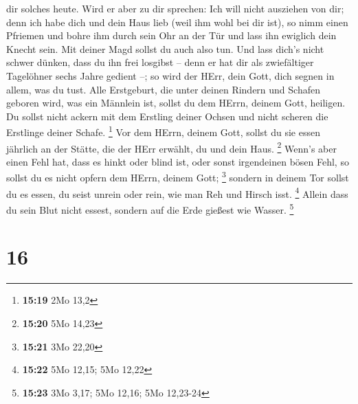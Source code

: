 dir solches heute.  Wird er aber zu dir sprechen: Ich
will nicht ausziehen von dir; denn ich habe dich und dein Haus lieb
(weil ihm wohl bei dir ist),  so nimm einen Pfriemen und
bohre ihm durch sein Ohr an der Tür und lass ihn ewiglich dein Knecht
sein. Mit deiner Magd sollst du auch also tun.  Und lass
dich's nicht schwer dünken, dass du ihn frei losgibst -- denn er hat dir
als zwiefältiger Tagelöhner sechs Jahre gedient --; so wird der HErr,
dein Gott, dich segnen in allem, was du tust.  Alle
Erstgeburt, die unter deinen Rindern und Schafen geboren wird, was ein
Männlein ist, sollst du dem HErrn, deinem Gott, heiligen. Du sollst
nicht ackern mit dem Erstling deiner Ochsen und nicht scheren die
Erstlinge deiner Schafe. \footnote{\textbf{15:19} 2Mo 13,2}
 Vor dem HErrn, deinem Gott, sollst du sie essen jährlich
an der Stätte, die der HErr erwählt, du und dein Haus. \footnote{\textbf{15:20}
  5Mo 14,23}  Wenn's aber einen Fehl hat, dass es hinkt
oder blind ist, oder sonst irgendeinen bösen Fehl, so sollst du es nicht
opfern dem HErrn, deinem Gott; \footnote{\textbf{15:21} 3Mo 22,20}
 sondern in deinem Tor sollst du es essen, du seist
unrein oder rein, wie man Reh und Hirsch isst. \footnote{\textbf{15:22}
  5Mo 12,15; 5Mo 12,22}  Allein dass du sein Blut nicht
essest, sondern auf die Erde gießest wie Wasser. \footnote{\textbf{15:23}
  3Mo 3,17; 5Mo 12,16; 5Mo 12,23-24}

\hypertarget{section-15}{%
\section{16}\label{section-15}}

